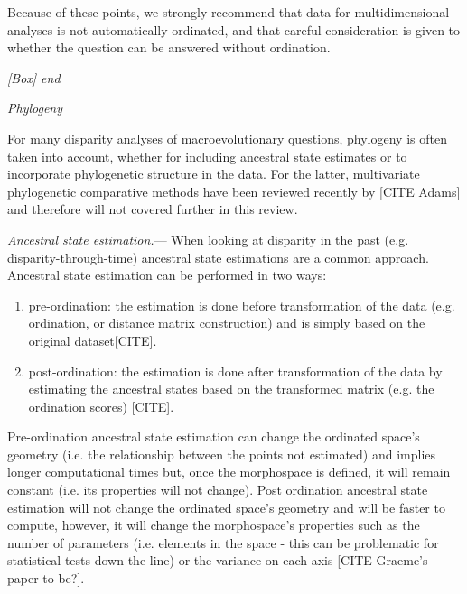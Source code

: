 \documentclass[12pt,letterpaper]{article}
\renewcommand{\subsection}[1]{%
\bigskip
\begin{center}
\begin{large}
\normalfont\itshape #1
\end{large}
\end{center}}
\renewcommand{\subsubsection}[1]{%
\vspace{2ex}
\noindent
\textit{#1.}---}
\begin{document}
Because of these points, we strongly recommend that data for multidimensional analyses is not automatically ordinated, and that careful consideration is given to whether the question can be answered without ordination.
\subsection{[Box] end}

\subsection{Phylogeny}
For many disparity analyses of macroevolutionary questions, phylogeny is often taken into account, whether for including ancestral state estimates or to incorporate phylogenetic structure in the data.
For the latter, multivariate phylogenetic comparative methods have been reviewed recently by [CITE Adams] %
and therefore will not covered further in this review.

\subsubsection{Ancestral state estimation}
When looking at disparity in the past (e.g. disparity-through-time) ancestral state estimations are a common approach.
Ancestral state estimation can be performed in two ways:
\begin{enumerate}
\item pre-ordination: the estimation is done before transformation of the data (e.g. ordination, or distance matrix construction) and is simply based on the original dataset[CITE].
\item post-ordination: the estimation is done after transformation of the data by estimating the ancestral states based on the transformed matrix (e.g. the ordination scores) [CITE].
\end{enumerate}
Pre-ordination ancestral state estimation can change the ordinated space's geometry (i.e. the relationship between the points not estimated) and implies longer computational times but, once the morphospace is defined, it will remain constant (i.e. its properties will not change).
Post ordination ancestral state estimation will not change the ordinated space's geometry and will be faster to compute, however, it will change the morphospace's properties such as the number of parameters (i.e. elements in the space - this can be problematic for statistical tests down the line) or the variance on each axis [CITE Graeme's paper to be?].
\end{document}
